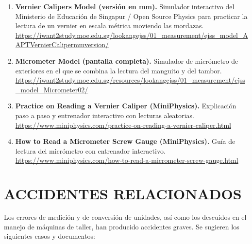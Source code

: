 \documentclass[12pt,a4paper]{article}
\begin{document}
\begin{enumerate}[label=\textbf{\arabic*.}]
	\item \textbf{Vernier Calipers Model (versión en mm).} Simulador interactivo
	      del Ministerio de Educación de Singapur / Open Source Physics para
	      practicar la
	      lectura de un vernier en escala métrica moviendo las mordazas. \\
	      \url{https://iwant2study.moe.edu.sg/lookangejss/01_measurement/ejss_model_AAPTVernierCalipermmversion/}
	\item \textbf{Micrometer Model (pantalla completa).} Simulador de micrómetro
	      de exteriores en el que se combina la lectura del manguito y del tambor.
	      \\
	      \url{https://iwant2study.moe.edu.sg/resources/lookangejss/01_measurement/ejss_model_Micrometer02/}
	\item \textbf{Practice on Reading a Vernier Caliper (MiniPhysics).}
	      Explicación paso a paso y entrenador interactivo con lecturas
	      aleatorias. \\
	      \url{https://www.miniphysics.com/practice-on-reading-a-vernier-caliper.html}
	\item \textbf{How to Read a Micrometer Screw Gauge (MiniPhysics).} Guía de
	      lectura del micrómetro con entrenador interactivo. \\
	      \url{https://www.miniphysics.com/how-to-read-a-micrometer-screw-gauge.html}
\end{enumerate}

\section{ACCIDENTES RELACIONADOS}

Los errores de medición y de conversión de unidades, así como los descuidos en
el manejo de máquinas de taller, han producido accidentes graves. Se sugieren
los siguientes casos y documentos:
\end{document}
